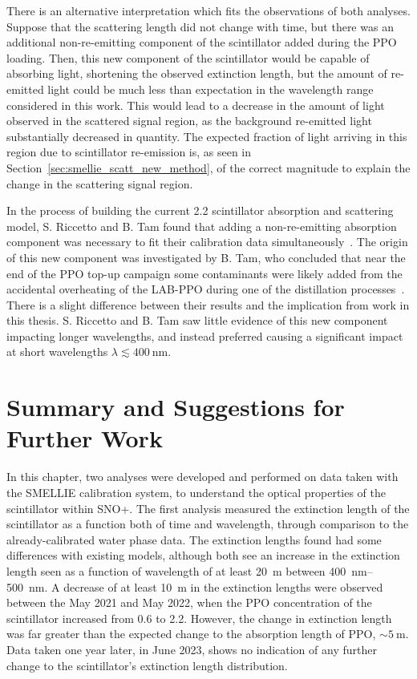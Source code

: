There is an alternative interpretation which fits the observations of both analyses. Suppose that the scattering length did not change with time, but there was an additional non-re-emitting component of the scintillator added during the PPO loading. Then, this new component of the scintillator would be capable of absorbing light, shortening the observed extinction length, but the amount of re-emitted light could be much less than expectation in the wavelength range considered in this work. This would lead to a decrease in the amount of light observed in the scattered signal region, as the background re-emitted light substantially decreased in quantity. The expected fraction of light arriving in this region due to scintillator re-emission is, as seen in Section~\ref{sec:smellie_scatt_new_method}, of the correct magnitude to explain the change in the scattering signal region.

In the process of building the current \SI{2.2}{\gpl} scintillator absorption and scattering model, S. Riccetto and B. Tam found that adding a non-re-emitting absorption component was necessary to fit their calibration data simultaneously~\cite{kaptanogluDocumentationAttenuationStudies2022}. %
The origin of this new component was investigated by B. Tam, who concluded that near the end of the PPO top-up campaign some contaminants were likely added from the accidental overheating of the LAB-PPO during one of the distillation processes~\cite{tamAttenuationMeasurements2022}. %
There is a slight difference between their results and the implication from work in this thesis. S. Riccetto and B. Tam saw little evidence of this new component impacting longer wavelengths, and instead preferred causing a significant impact at short wavelengths $\lambda\lesssim\SI{400}{\nm}$.

\section{Summary and Suggestions for Further Work}
In this chapter, two analyses were developed and performed on data taken with the SMELLIE calibration system, to understand the optical properties of the scintillator within SNO+. The first analysis measured the extinction length of the scintillator as a function both of time and wavelength, through comparison to the already-calibrated water phase data. The extinction lengths found had some differences with existing models, although both see an increase in the extinction length seen as a function of wavelength of at least \SI{20}{\metre} between \SIrange{400}{500}{\nm}. A decrease of at least \SI{10}{\metre} in the extinction lengths were observed between the May 2021 and May 2022, when the PPO concentration of the scintillator increased from \SI{0.6}{\gpl} to \SI{2.2}{\gpl}. However, the change in extinction length was far greater than the expected change to the absorption length of PPO, $\sim\SI{5}{\metre}$. Data taken one year later, in June 2023, shows no indication of any further change to the scintillator's extinction length distribution.

